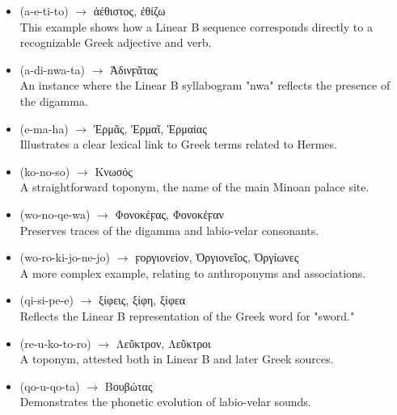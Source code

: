\begin{itemize}  
    \item \textlinb{\Ba\Be\Bti\Bto} (a-e-ti-to) $\rightarrow$ \textgreek{ἀέθιστος}, \textgreek{ἐθίζω} \\  
    This example shows how a Linear B sequence corresponds directly to a recognizable Greek adjective and verb.  

    \item \textlinb{\Ba\Bdi\Bnwa\Bta} (a-di-nwa-ta) $\rightarrow$ \textgreek{Ἀδινϝᾶτας} \\  
    An instance where the Linear B syllabogram "nwa" reflects the presence of the digamma.  

    \item \textlinb{\Be\Bma\Baii} (e-ma-ha) $\rightarrow$ \textgreek{Ἑρμᾶς}, \textgreek{Ἑρμαῖ}, \textgreek{Ἑρμαίας} \\  
    Illustrates a clear lexical link to Greek terms related to Hermes.  

    \item \textlinb{\Bko\Bno\Bso} (ko-no-so) $\rightarrow$ \textgreek{Κνωσός}\\  
    A straightforward toponym, the name of the main Minoan palace site.  

    \item \textlinb{\Bwo\Bno\Bqe\Bwa} (wo-no-qe-wa) $\rightarrow$ \textgreek{Φονοκέϝας}, \textgreek{Φονοκέϝαν} \\  
    Preserves traces of the digamma and labio-velar consonants.  

    \item \textlinb{\Bwo\Bro\Bki\Bjo\Bne\Bjo} (wo-ro-ki-jo-ne-jo) $\rightarrow$ \textgreek{ϝοργιονείον}, \textgreek{Ὀργιονεῖος}, \textgreek{Ὀργίωνες} \\  
    A more complex example, relating to anthroponyms and associations.  

    \item \textlinb{\Bqi\Bsi\Bpe\Be} (qi-si-pe-e) $\rightarrow$ \textgreek{ξίφεις}, \textgreek{ξίφη}, \textgreek{ξίφεα} \\  
    Reflects the Linear B representation of the Greek word for "sword."  

    \item \textlinb{\Bre\Bu\Bko\Bto\Bro} (re-u-ko-to-ro) $\rightarrow$ \textgreek{Λεῦκτρον}, \textgreek{Λεῦκτροι} \\  
    A toponym, attested both in Linear B and later Greek sources.  

    \item \textlinb{\Bqo\Bu\Bqo\Bta} (qo-u-qo-ta) $\rightarrow$ \textgreek{Βουβώτας} \\  
    Demonstrates the phonetic evolution of labio-velar sounds.  


\end{itemize}

